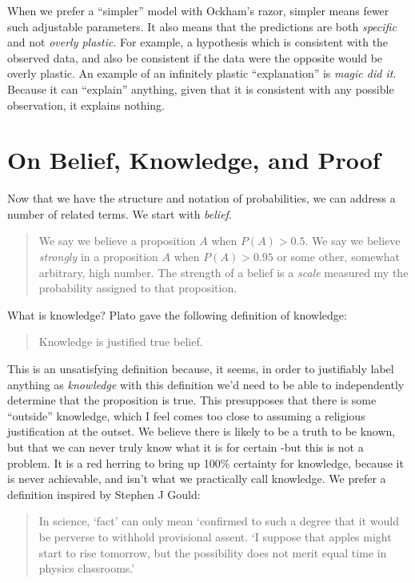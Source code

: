 When we prefer a ``simpler'' model with Ockham's razor, simpler means fewer such adjustable parameters.  It also means that the predictions are both {\em specific} and not {\em overly plastic}. For example, a hypothesis which is consistent with the observed data, and also be consistent if the data were the opposite would be overly plastic.  An example of an infinitely plastic ``explanation'' is {\em magic did it}.  Because it can ``explain'' anything, given that it is consistent with any possible observation, it explains nothing.


\section{On Belief, Knowledge, and Proof}

Now that we have the structure and notation of probabilities, we can address a number of related terms.  We start with {\em belief}. 
\begin{quote}
We say we believe a proposition $A$ when $P(A)>0.5$.  We say we
believe \emph{strongly} in a proposition $A$ when $P(A)>0.95$
or some other, somewhat arbitrary, high number.  The strength of a
belief is a \emph{scale} measured my the probability assigned to that proposition.
\end{quote}

What is knowledge?  Plato gave the following definition of knowledge:

\begin{quote}
Knowledge is justified true belief.\cite{fine2003plato}
\end{quote}

This is an unsatisfying definition because, it seems, in
order to justifiably label anything as \emph{knowledge} with this
definition we'd need to be able to independently determine that the
proposition is true. This presupposes that there is some ``outside''
knowledge, which I feel comes too close to assuming a religious
justification at the outset.  We believe there is likely to be a truth to be known, but that we can never truly know what it is for certain -but this is not a problem. It is a red herring to bring up 100\% certainty for knowledge, because it is never achievable, and isn't what we practically call knowledge. We prefer a definition inspired by Stephen J Gould:


\begin{quote}
In science, `fact' can only mean `confirmed to such a degree that it
would be perverse to withhold provisional assent. `I suppose that apples
might start to rise tomorrow, but the possibility does not merit equal
time in physics classrooms.'\cite{gould1981evolution}
\end{quote}

